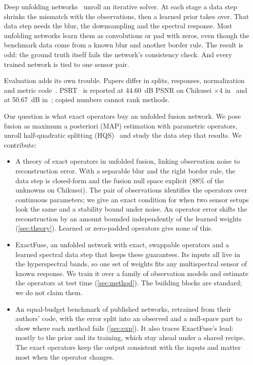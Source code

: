 \documentclass[10pt,twocolumn,letterpaper]{article}
\begin{document}
Deep unfolding networks~\cite{xie2022mhfnet,dong2021mogdcn,huang2022dhif} unroll an iterative solver. At each stage a data step shrinks the mismatch with the observations, then a learned prior takes over. That data step needs the blur, the downsampling and the spectral response. Most unfolding networks learn them as convolutions or pad with zeros, even though the benchmark data come from a known blur and another border rule. The result is odd: the ground truth itself fails the network's consistency check. And every trained network is tied to one sensor pair.

Evaluation adds its own trouble. Papers differ in splits, responses, normalization and metric code~\cite{vivone2025deep}. PSRT~\cite{deng2023psrt} is reported at 44.60~dB PSNR on Chikusei $\times$4 in~\cite{pei2026s3o} and at 50.67~dB in~\cite{chen2026twostage}; copied numbers cannot rank methods.

Our question is what exact operators buy an unfolded fusion network. We pose fusion as maximum a posteriori (MAP) estimation with parametric operators, unroll half-quadratic splitting (HQS)~\cite{zhang2020usrnet} and study the data step that results. We contribute:
\begin{itemize}
\item A theory of exact operators in unfolded fusion, linking observation noise to reconstruction error. With a separable blur and the right border rule, the data step is closed-form and the fusion null space explicit (88\% of the unknowns on Chikusei). The pair of observations identifies the operators over continuous parameters; we give an exact condition for when two sensor setups look the same and a stability bound under noise. An operator error shifts the reconstruction by an amount bounded independently of the learned weights (\cref{sec:theory}). Learned or zero-padded operators give none of this.
\item ExactFuse, an unfolded network with exact, swappable operators and a learned spectral data step that keeps these guarantees. Its inputs all live in the hyperspectral bands, so one set of weights fits any multispectral sensor of known response. We train it over a family of observation models and estimate the operators at test time (\cref{sec:method}). The building blocks are standard; we do not claim them.
\item An equal-budget benchmark of  published networks, retrained from their authors' code, with the error split into an observed and a null-space part to show where each method fails (\cref{sec:exp}). It also traces ExactFuse's lead: mostly to the prior and its training, which stay ahead under a shared recipe. The exact operators keep the output consistent with the inputs and matter most when the operator changes.
\end{itemize}
\end{document}

